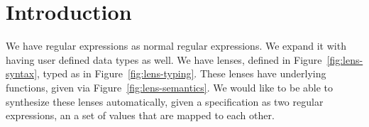 
\section{Introduction}




We have regular expressions as normal regular expressions.
We expand it with having user defined data types as well.
We have lenses, defined in Figure~\ref{fig:lens-syntax}, typed as in Figure~\ref{fig:lens-typing}.
These lenses have underlying functions, given via Figure~\ref{fig:lens-semantics}.
We would like to be able to synthesize these lenses automatically, given a
specification as two regular expressions, an a set of values that are
mapped to each other.
